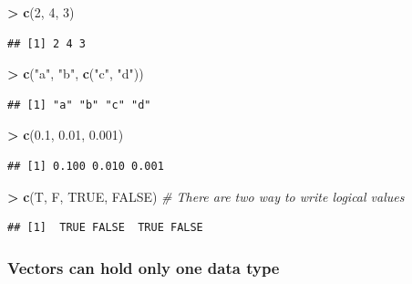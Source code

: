 \documentclass[]{book}
\newenvironment{Shaded}{\begin{snugshade}}{\end{snugshade}}
\newcommand{\CommentTok}[1]{\textcolor[rgb]{0.56,0.35,0.01}{\textit{#1}}}
\newcommand{\DecValTok}[1]{\textcolor[rgb]{0.00,0.00,0.81}{#1}}
\newcommand{\FloatTok}[1]{\textcolor[rgb]{0.00,0.00,0.81}{#1}}
\newcommand{\KeywordTok}[1]{\textcolor[rgb]{0.13,0.29,0.53}{\textbf{#1}}}
\newcommand{\NormalTok}[1]{#1}
\newcommand{\OperatorTok}[1]{\textcolor[rgb]{0.81,0.36,0.00}{\textbf{#1}}}
\newcommand{\OtherTok}[1]{\textcolor[rgb]{0.56,0.35,0.01}{#1}}
\newcommand{\StringTok}[1]{\textcolor[rgb]{0.31,0.60,0.02}{#1}}
\begin{document}
\begin{Shaded}
\begin{Highlighting}[]
\OperatorTok{>}\StringTok{ }\KeywordTok{c}\NormalTok{(}\DecValTok{2}\NormalTok{, }\DecValTok{4}\NormalTok{, }\DecValTok{3}\NormalTok{)}
\end{Highlighting}
\end{Shaded}

\begin{verbatim}
## [1] 2 4 3
\end{verbatim}

\begin{Shaded}
\begin{Highlighting}[]
\OperatorTok{>}\StringTok{ }\KeywordTok{c}\NormalTok{(}\StringTok{"a"}\NormalTok{, }\StringTok{"b"}\NormalTok{, }\KeywordTok{c}\NormalTok{(}\StringTok{"c"}\NormalTok{, }\StringTok{"d"}\NormalTok{))}
\end{Highlighting}
\end{Shaded}

\begin{verbatim}
## [1] "a" "b" "c" "d"
\end{verbatim}

\begin{Shaded}
\begin{Highlighting}[]
\OperatorTok{>}\StringTok{ }\KeywordTok{c}\NormalTok{(}\FloatTok{0.1}\NormalTok{, }\FloatTok{0.01}\NormalTok{, }\FloatTok{0.001}\NormalTok{)}
\end{Highlighting}
\end{Shaded}

\begin{verbatim}
## [1] 0.100 0.010 0.001
\end{verbatim}

\begin{Shaded}
\begin{Highlighting}[]
\OperatorTok{>}\StringTok{ }\KeywordTok{c}\NormalTok{(T, F, }\OtherTok{TRUE}\NormalTok{, }\OtherTok{FALSE}\NormalTok{) }\CommentTok{# There are two way to write logical values}
\end{Highlighting}
\end{Shaded}

\begin{verbatim}
## [1]  TRUE FALSE  TRUE FALSE
\end{verbatim}

\hypertarget{vectors-can-hold-only-one-data-type}{%
\subsubsection*{Vectors can hold only one data type}\label{vectors-can-hold-only-one-data-type}}
\end{document}
